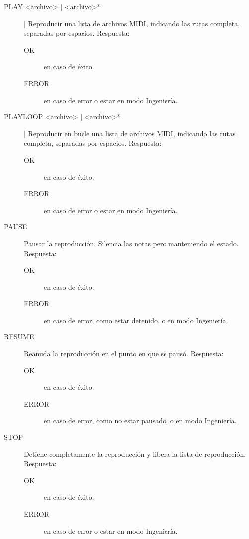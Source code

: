 \begin{description}
	\item[PLAY <archivo> [ <archivo>*]] Reproducir una lista de archivos MIDI, indicando las rutas completa, separadas por espacios. Respuesta:
	
	\begin{description}
		\item[OK] en caso de éxito.
		\item[ERROR] en caso de error o estar en modo Ingeniería.
	\end{description}
	
	\item[PLAYLOOP <archivo> [ <archivo>*]] Reproducir en bucle una lista de archivos MIDI, indicando las rutas completa, separadas por espacios. Respuesta:
	
	\begin{description}
		\item[OK] en caso de éxito.
		\item[ERROR] en caso de error o estar en modo Ingeniería.
	\end{description}
	
	\item[PAUSE] Pausar la reproducción. Silencia las notas pero manteniendo el estado. Respuesta:
	
	\begin{description}
		\item[OK] en caso de éxito.
		\item[ERROR] en caso de error, como estar detenido, o en modo Ingeniería.
	\end{description}
	
	\item[RESUME] Reanuda la reproducción en el punto en que se pausó. Respuesta:
	
	\begin{description}
		\item[OK] en caso de éxito.
		\item[ERROR] en caso de error, como no estar pausado, o en modo Ingeniería.
	\end{description}
	
	\item[STOP] Detiene completamente la reproducción y libera la lista de reproducción. Respuesta:
	
	\begin{description}
		\item[OK] en caso de éxito.
		\item[ERROR] en caso de error o estar en modo Ingeniería.
	\end{description}
	

\end{description}
